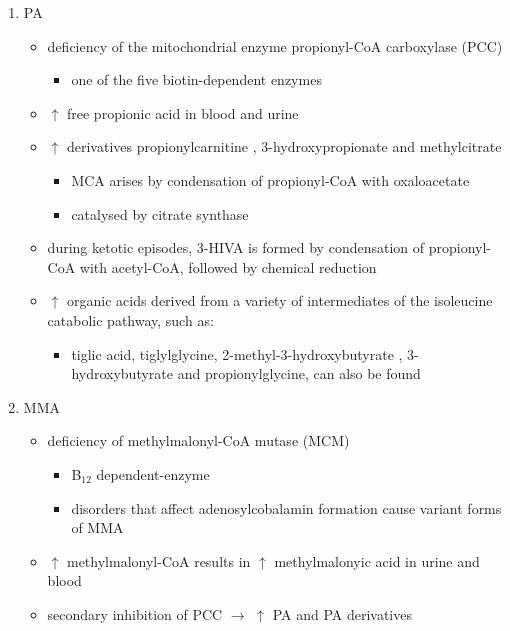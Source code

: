 \documentclass{scrartcl}
\begin{document}
\begin{enumerate}
\item PA
\label{sec:orga36fac0}
\begin{itemize}
\item deficiency of the mitochondrial enzyme propionyl-CoA carboxylase (PCC)
\begin{itemize}
\item one of the five biotin-dependent enzymes
\end{itemize}
\item \(\uparrow\) free propionic acid in blood and urine
\item \(\uparrow\) derivatives propionylcarnitine , 3-hydroxypropionate and methylcitrate
\begin{itemize}
\item MCA arises by condensation of propionyl-CoA with oxaloacetate
\item catalysed by citrate synthase
\end{itemize}
\item during ketotic episodes, 3-HIVA is formed by condensation of
propionyl-CoA with acetyl-CoA, followed by chemical reduction
\item \(\uparrow\) organic acids derived from a variety of intermediates of
the isoleucine catabolic pathway, such as:
\begin{itemize}
\item tiglic acid, tiglylglycine, 2-methyl-3-hydroxybutyrate ,
3-hydroxybutyrate and propionylglycine, can also be found
\end{itemize}
\end{itemize}

\item MMA
\label{sec:org60ec8ea}
\begin{itemize}
\item deficiency of methylmalonyl-CoA mutase (MCM)
\begin{itemize}
\item B\(_{\text{12}}\) dependent-enzyme
\item disorders that affect adenosylcobalamin formation cause variant
forms of MMA
\end{itemize}
\item \(\uparrow\) methylmalonyl-CoA results in \(\uparrow\) methylmalonyic acid
in urine and blood
\item secondary inhibition of PCC \(\to\) \(\uparrow\) PA and PA derivatives
\end{itemize}


\end{enumerate}
\end{document}
